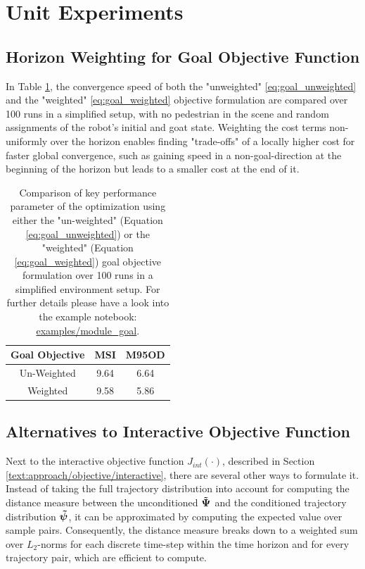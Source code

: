 \section{Unit Experiments}
\label{text:experiments/unit}

\subsection{Horizon Weighting for Goal Objective Function}
In Table \ref{table:goal_horizon_weighting}, the convergence speed of both the "unweighted" \ref{eq:goal_unweighted} and the "weighted" \ref{eq:goal_weighted} objective formulation are compared over 100 runs in a simplified setup, with no pedestrian in the scene and random assignments of the robot's initial and goat state. Weighting the cost terms non-uniformly over the horizon enables finding "trade-offs" of a locally higher cost for faster global convergence, such as gaining speed in a non-goal-direction at the beginning of the horizon but leads to a smaller cost at the end of it.

\begin{table}[!ht]
\begin{center}
\begin{tabular}{c|c|c}
\bf Goal Objective & \bf MSI & \bf M95OD \\
\hline
Un-Weighted & 9.64 & 6.64 \\
\hline
\rowcolor{our_color}
Weighted & 9.58 & 5.86 \\
\end{tabular}
\caption{Comparison of key performance parameter of the optimization using either the "un-weighted" (Equation \ref{eq:goal_unweighted}) or the "weighted" (Equation  \ref{eq:goal_weighted}) goal objective formulation over 100 runs in a simplified environment setup. For further details please have a look into the example notebook: \href{https://github.com/simon-schaefer/mantrap/blob/master/examples/module_goal.ipynb}{examples/module\_goal}.}
\label{table:goal_horizon_weighting}
\end{center}
\end{table}

\subsection{Alternatives to Interactive Objective Function}
Next to the interactive objective function $J_{int}(\cdot)$, described in Section \ref{text:approach/objective/interactive}, there are several other ways to formulate it. Instead of taking the full trajectory distribution into account for computing the distance measure between the unconditioned $\distwo[]$ and the conditioned trajectory distribution $\dist[]$, it can be approximated by computing the expected value over sample pairs. Consequently, the distance measure breaks down to a weighted sum over $L_2$-norms for each discrete time-step within the time horizon and for every trajectory pair, which are efficient to compute.

